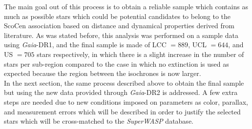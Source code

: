 
The main goal out of this process is to obtain a reliable sample which contains as much as possible stars which could be potential candidates to belong to the ScoCen association based on distance and dynamical properties derived from literature. As was stated before, this analysis was performed on a sample data using \textit{Gaia}-DR1, and the final sample is made of LCC $= 889$, UCL $= 644$, and US $= 705$ stars respectively, in which there is a slight increase in the number of stars per sub-region compared to the case in which no extinction is used as expected because the region between the isochrones is now larger.\\

In the next section, the same process described above to obtain the final sample but using the new data provided through \textit{Gaia}-DR2 is addressed. A few extra steps are needed due to new conditions imposed on parameters as color, parallax, and measurement errors which will be described in order to justify the selected stars which will be cross-matched to the \textit{SuperWASP} database.  

